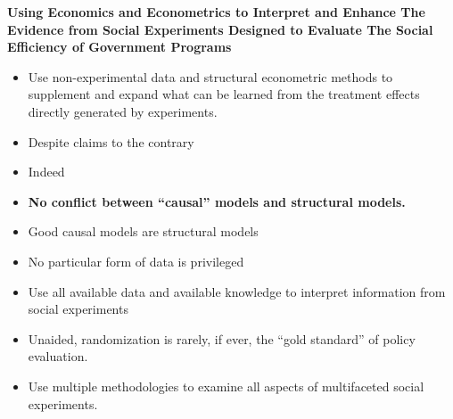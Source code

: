 \documentclass[static]{JJH-Beamer}
\begin{document}
\begin{frame}

\begin{center}
\textbf{Using Economics and Econometrics to Interpret and Enhance The Evidence from Social Experiments Designed to Evaluate The Social Efficiency of Government Programs}
\end{center}

\end{frame}

\begin{frame}

\begin{itemize}
\item Use non-experimental data and structural econometric methods to supplement and expand what can be learned from the treatment effects directly generated by experiments.
\end{itemize}

\end{frame}


\begin{itemize}
\item Despite claims to the contrary
\item Indeed
\end{itemize}

\begin{frame}

\begin{itemize}
\item \textbf{No conflict between ``causal'' models and structural models.}
\item Good causal models are structural models
\item No particular form of data is privileged
\item Use all available data and available knowledge to interpret information from social experiments
\end{itemize}

\end{frame}

\begin{frame}

\begin{itemize}
\item Unaided, randomization is rarely, if ever, the ``gold standard'' of policy evaluation.
\item Use multiple methodologies to examine all aspects of multifaceted social experiments.
\end{itemize}

\end{frame}
\end{document}
